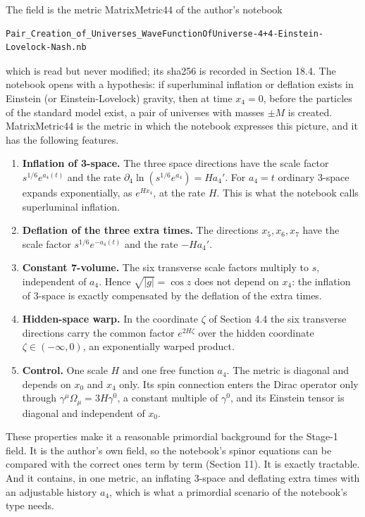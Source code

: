 \documentclass[11pt]{article}
\begin{document}
The field is the metric MatrixMetric44 of the author's notebook

\begin{Verbatim}[fontsize=\small]
Pair_Creation_of_Universes_WaveFunctionOfUniverse-4+4-Einstein-Lovelock-Nash.nb
\end{Verbatim}

which is read but never modified; its sha256 is recorded in Section 18.4. The notebook opens with a hypothesis: if superluminal inflation or deflation exists in Einstein (or Einstein-Lovelock) gravity, then at time $x_4=0$, before the particles of the standard model exist, a pair of universes with masses $\pm M$ is created. MatrixMetric44 is the metric in which the notebook expresses this picture, and it has the following features.

\begin{enumerate}
\item \textbf{Inflation of 3-space.} The three space directions have the scale factor $s^{1/6}e^{a_4(t)}$ and the rate $\partial_4\ln(s^{1/6}e^{a_4})=Ha_4'$. For $a_4=t$ ordinary 3-space expands exponentially, as $e^{Hx_4}$, at the rate $H$. This is what the notebook calls superluminal inflation.
\item \textbf{Deflation of the three extra times.} The directions $x_5,x_6,x_7$ have the scale factor $s^{1/6}e^{-a_4(t)}$ and the rate $-Ha_4'$.
\item \textbf{Constant 7-volume.} The six transverse scale factors multiply to $s$, independent of $a_4$. Hence $\sqrt{|g|}=\cos z$ does not depend on $x_4$: the inflation of 3-space is exactly compensated by the deflation of the extra times.
\item \textbf{Hidden-space warp.} In the coordinate $\zeta$ of Section 4.4 the six transverse directions carry the common factor $e^{2H\zeta}$ over the hidden coordinate $\zeta\in(-\infty,0)$, an exponentially warped product.
\item \textbf{Control.} One scale $H$ and one free function $a_4$. The metric is diagonal and depends on $x_0$ and $x_4$ only. Its spin connection enters the Dirac operator only through $\gamma^\mu\Omega_\mu=3H\gamma^0$, a constant multiple of $\gamma^0$, and its Einstein tensor is diagonal and independent of $x_0$.
\end{enumerate}

These properties make it a reasonable primordial background for the Stage-1 field. It is the author's own field, so the notebook's spinor equations can be compared with the correct ones term by term (Section 11). It is exactly tractable. And it contains, in one metric, an inflating 3-space and deflating extra times with an adjustable history $a_4$, which is what a primordial scenario of the notebook's type needs.
\end{document}
